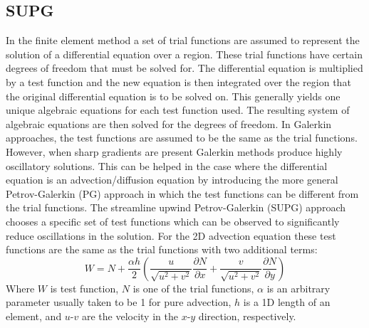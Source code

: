 \subsection{SUPG}
\label{SUPG}
In the finite element method a set of trial functions are assumed to represent the solution of a differential equation over a region. These trial functions have certain degrees of freedom that must be solved for. The differential equation is multiplied by a test function and the new equation is then integrated over the region that the original differential equation is to be solved on. This generally yields one unique algebraic equations for each test function used. The resulting system of algebraic equations are then solved for the degrees of freedom. 
In Galerkin approaches, the test functions are assumed to be the same as the trial functions. However, when sharp gradients are present Galerkin methods produce highly oscillatory solutions. This can be helped in the case where the differential equation is an advection/diffusion equation by introducing the more general Petrov-Galerkin (PG) approach in which the test functions can be different from the trial functions. The streamline upwind Petrov-Galerkin (SUPG) approach chooses a specific set of test functions which can be observed to significantly reduce oscillations in the solution. For the 2D advection equation these test functions are the same as the trial functions with two additional terms:
\begin{equation}
W = N + \frac{\alpha h}{2}\left(\frac{u}{\sqrt{u^2+v^2}}\frac{\partial N}{\partial x} + \frac{v}{\sqrt{u^2+v^2}}\frac{\partial N}{\partial y}\right)
\end{equation}
Where $W$ is test function, $N$ is one of the trial functions, $\alpha$ is an arbitrary parameter usually taken to be 1 for pure advection, $h$ is a 1D length of an element, and $u$-$v$ are the velocity in the $x$-$y$ direction, respectively.
